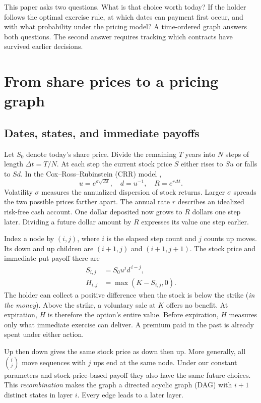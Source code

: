 \documentclass[11pt]{article}
\begin{document}
This paper asks two questions. What is that choice worth today? If the holder follows the optimal exercise rule, at which dates can payment first occur, and with what probability under the pricing model? A time-ordered graph answers both questions. The second answer requires tracking which contracts have survived earlier decisions.

\section{From share prices to a pricing graph}
\subsection{Dates, states, and immediate payoffs}
Let $S_0$ denote today's share price. Divide the remaining $T$ years into $N$ steps of length $\Delta t=T/N$. At each step the current stock price $S$ either rises to $Su$ or falls to $Sd$. In the Cox--Ross--Rubinstein (CRR) model \citep{crr},
\begin{equation}
u=e^{\sigma\sqrt{\Delta t}},\quad d=u^{-1},\quad
R=e^{r\Delta t}.
\label{eq:factors}
\end{equation}
Volatility $\sigma$ measures the annualized dispersion of stock returns. Larger $\sigma$ spreads the two possible prices farther apart. The annual rate $r$ describes an idealized risk-free cash account. One dollar deposited now grows to $R$ dollars one step later. Dividing a future dollar amount by $R$ expresses its value one step earlier.

Index a node by $(i,j)$, where $i$ is the elapsed step count and $j$ counts up moves. Its down and up children are $(i+1,j)$ and $(i+1,j+1)$. The stock price and immediate put payoff there are
\begin{align}
S_{i,j} &= S_0 u^j d^{\,i-j}, \\
H_{i,j} &= \max(K-S_{i,j},0). \label{eq:payoff}
\end{align}
The holder can collect a positive difference when the stock is below the strike (\emph{in the money}). Above the strike, a voluntary sale at $K$ offers no benefit. At expiration, $H$ is therefore the option's entire value. Before expiration, $H$ measures only what immediate exercise can deliver. A premium paid in the past is already spent under either action.

Up then down gives the same stock price as down then up. More generally, all $\binom{i}{j}$ move sequences with $j$ ups end at the same node. Under our constant parameters and stock-price-based payoff they also have the same future choices. This \emph{recombination} makes the graph a directed acyclic graph (DAG) with $i+1$ distinct states in layer $i$. Every edge leads to a later layer.
\end{document}
